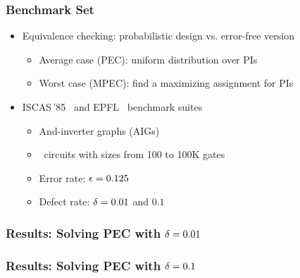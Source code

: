 \begin{frame}
    \frametitle{Benchmark Set}
    \begin{itemize}
        \item Equivalence checking: probabilistic design vs. error-free version
              \pause
              \begin{itemize}
                  \item Average case (PEC): uniform distribution over PIs
                  \item Worst case (MPEC): find a maximizing assignment for PIs
              \end{itemize}
              \pause
        \item ISCAS\,'85~\cite{ISCAS85-benchmark}
              and EPFL~\cite{EPFL-benchmark} benchmark suites
              \pause
              \begin{itemize}
                  \item And-inverter graphs (AIGs)
                  \item \ncircuit~circuits with sizes from 100 to 100K gates
                  \item Error rate: $\epsilon=0.125$
                  \item Defect rate: $\delta=0.01$ and $0.1$
              \end{itemize}
    \end{itemize}
\end{frame}

\begin{frame}
    \frametitle{Results: Solving PEC with $\delta=0.01$}
    \begin{table}
        \centering
        \tiny
    \end{table}
\end{frame}

\begin{frame}
    \frametitle{Results: Solving PEC with $\delta=0.1$}
    \begin{table}
        \centering
        \tiny
    \end{table}
\end{frame}

